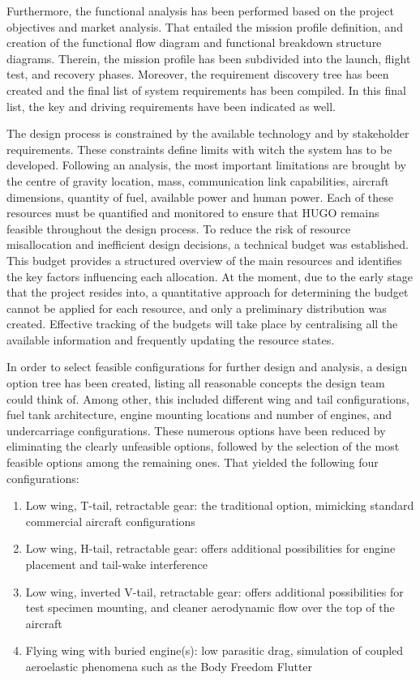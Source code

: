Furthermore, the functional analysis has been performed based on the project objectives and market analysis. That entailed the mission profile definition, and creation of the functional flow diagram and functional breakdown structure diagrams. Therein, the mission profile has been subdivided into the launch, flight test, and recovery phases. Moreover, the requirement discovery tree has been created and the final list of system requirements has been compiled. In this final list, the key and driving requirements have been indicated as well.

The design process is constrained by the available technology and by stakeholder requirements. These constraints define limits with witch the system has to be developed. Following an analysis, the most important limitations are brought by the centre of gravity location, mass, communication link capabilities, aircraft dimensions, quantity of fuel, available power and human power. Each of these resources must be quantified and monitored to ensure that HUGO remains feasible throughout the design process. To reduce the risk of resource misallocation and inefficient design decisions, a technical budget was established. This budget provides a structured overview of the main resources and identifies the key factors influencing each allocation.
At the moment, due to the early stage that the project resides into, a quantitative approach for determining the budget cannot be applied for each resource, and only a preliminary distribution was created.
Effective tracking of the budgets will take place by centralising all the available information and frequently updating the resource states.

In order to select feasible configurations for further design and analysis, a design option tree has been created, listing all reasonable concepts the design team could think of. Among other, this included different wing and tail configurations, fuel tank architecture, engine mounting locations and number of engines, and undercarriage configurations. These numerous options have been reduced by eliminating the clearly unfeasible options, followed by the selection of the most feasible options among the remaining ones. That yielded the following four configurations:

\begin{enumerate}
    \item Low wing, T-tail, retractable gear: the traditional option, mimicking standard commercial aircraft configurations
    \item Low wing, H-tail, retractable gear: offers additional possibilities for engine placement and tail-wake interference
    \item Low wing, inverted V-tail, retractable gear: offers additional possibilities for test specimen mounting, and cleaner aerodynamic flow over the top of the aircraft
    \item Flying wing with buried engine(s): low parasitic drag, simulation of coupled aeroelastic phenomena such as the Body Freedom Flutter
\end{enumerate}

